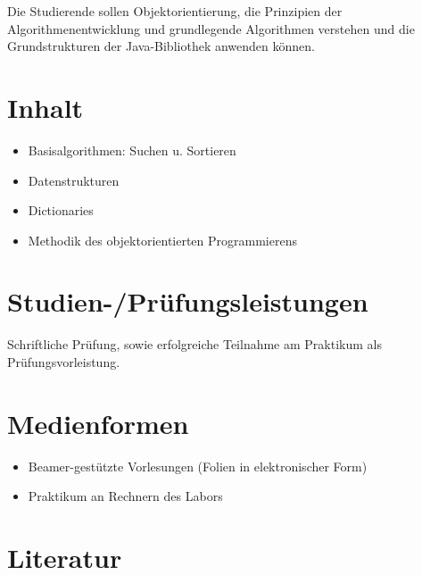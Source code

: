Die Studierende sollen Objektorientierung, die Prinzipien der
Algorithmenentwicklung und grundlegende Algorithmen verstehen und die
Grundstrukturen der Java-Bibliothek anwenden können.

\section*{Inhalt\label{/mi-2017/modulbeschreibungen-bachelor/BA_AlgorithmenundProgrammierung2}}\label{inhaltpathlabelmi-2017modulbeschreibungen-bachelorbaux5falgorithmenundprogrammierung2}

\begin{itemize}
\tightlist
\item
  Basisalgorithmen: Suchen u. Sortieren
\item
  Datenstrukturen
\item
  Dictionaries
\item
  Methodik des objektorientierten Programmierens
\end{itemize}

\section*{Studien-/Prüfungsleistungen\label{/mi-2017/modulbeschreibungen-bachelor/BA_AlgorithmenundProgrammierung2}}\label{studien-pruxfcfungsleistungenpathlabelmi-2017modulbeschreibungen-bachelorbaux5falgorithmenundprogrammierung2}

Schriftliche Prüfung, sowie erfolgreiche Teilnahme am Praktikum als
Prüfungsvorleistung.

\section*{Medienformen\label{/mi-2017/modulbeschreibungen-bachelor/BA_AlgorithmenundProgrammierung2}}\label{medienformenpathlabelmi-2017modulbeschreibungen-bachelorbaux5falgorithmenundprogrammierung2}

\begin{itemize}
\tightlist
\item
  Beamer-gestützte Vorlesungen (Folien in elektronischer Form)
\item
  Praktikum an Rechnern des Labors
\end{itemize}

\section*{Literatur\label{/mi-2017/modulbeschreibungen-bachelor/BA_AlgorithmenundProgrammierung2}}\label{literaturpathlabelmi-2017modulbeschreibungen-bachelorbaux5falgorithmenundprogrammierung2}

